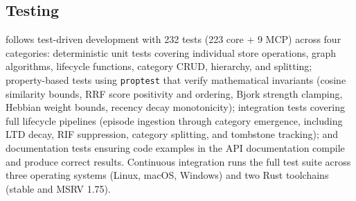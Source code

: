 \subsection{Testing}

\alaya{} follows test-driven development with 232 tests (223 core + 9 MCP)
across four categories: deterministic unit tests covering individual store
operations, graph algorithms, lifecycle functions, category CRUD, hierarchy,
and splitting; property-based tests using \texttt{proptest} that verify
mathematical invariants (cosine similarity bounds, RRF score positivity and
ordering, Bjork strength clamping, Hebbian weight bounds, recency decay
monotonicity); integration tests covering full lifecycle pipelines (episode
ingestion through category emergence, including LTD decay, RIF suppression,
category splitting, and tombstone tracking); and documentation tests
ensuring code examples in the API documentation compile and produce correct
results. Continuous
integration runs the full test suite across three operating systems (Linux,
macOS, Windows) and two Rust toolchains (stable and MSRV 1.75).

